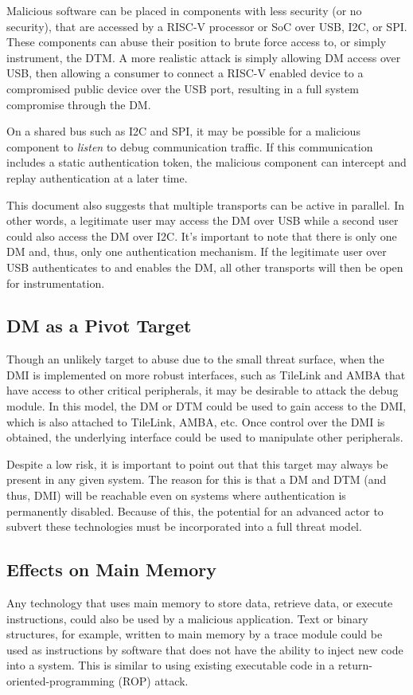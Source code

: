 Malicious software can be placed in components with less security (or no security), that are accessed by a RISC-V processor or SoC over USB, I2C, or SPI. These components can abuse their position to brute force access to, or simply instrument, the DTM. A more realistic attack is simply allowing DM access over USB, then allowing a consumer to connect a RISC-V enabled device to a compromised public device over the USB port, resulting in a full system compromise through the DM. 

On a shared bus such as I2C and SPI, it may be possible for a malicious component to {\em listen} to debug communication traffic. If this communication includes a static authentication token, the malicious component can intercept and replay authentication at a later time.

This document also suggests that multiple transports can be active in parallel. In other words, a legitimate user may access the DM over USB while a second user could also access the DM over I2C. It's important to note that there is only one DM and, thus, only one authentication mechanism. If the legitimate user over USB authenticates to and enables the DM, all other transports will then be open for instrumentation. 

\subsection{DM as a Pivot Target}
Though an unlikely target to abuse due to the small threat surface, when the DMI is implemented on more robust interfaces, such as TileLink and AMBA that have access to other critical peripherals, it may be desirable to attack the debug module. In this model, the DM or DTM could be used to gain access to the DMI, which is also attached to TileLink, AMBA, etc. Once control over the DMI is obtained, the underlying interface could be used to manipulate other peripherals. 

Despite a low risk, it is important to point out that this target may always be present in any given system. The reason for this is that a DM and DTM (and thus, DMI) will be reachable even on systems where authentication is permanently disabled. Because of this, the potential for an advanced actor to subvert these technologies must be incorporated into a full threat model. 

\subsection{Effects on Main Memory}
Any technology that uses main memory to store data, retrieve data, or execute instructions, could also be used by a malicious application. Text or binary structures, for example, written to main memory by a trace module could be used as instructions by software that does not have the ability to inject new code into a system. This is similar to using existing executable code in a return-oriented-programming (ROP) attack. 


